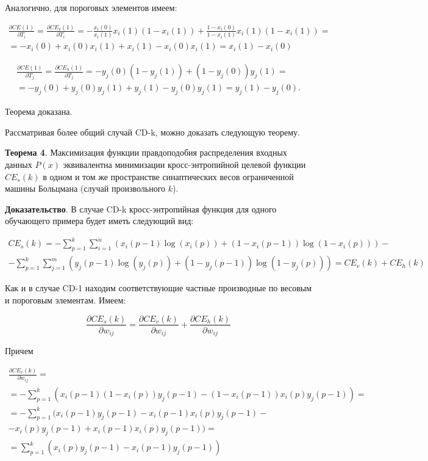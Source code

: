 Аналогично, для пороговых элементов имеем:

\begin{multline*}
	\frac{\partial CE(1)}{\partial T_i} = \frac{\partial CE_v(1)}{\partial T_i} = -\frac{x_i(0)}{x_i(1)}x_i(1)(1-x_i(1))+\frac{1-x_i(0)}{1-x_i(1)}x_i(1)(1-x_i(1)) = \\ = -x_i(0) + x_i(0)x_i(1)+x_i(1)-x_i(0)x_i(1) = x_i(1)-x_i(0) 
\end{multline*}

\begin{multline*}
	\frac{\partial CE(1)}{\partial T_j} = \frac{\partial CE_h(1)}{\partial T_j} = -y_j(0)(1-y_j(1)) + (1-y_j(0))y_j(1) = \\ = -y_j(0) + y_j(0)y_j(1) + y_j(1) - y_j(0)y_j(1) = y_j(1) - y_j(0).
\end{multline*}

Теорема доказана. 

Рассматривая более общий случай CD-k, можно доказать следующую теорему.

\textbf{Теорема 4}. Максимизация функции правдоподобия распределения входных данных $P(x)$ эквивалентна минимизации кросс-энтропийной целевой функции $CE_s(k)$ в одном и том же пространстве синаптических весов ограниченной машины Больцмана (случай произвольного $k$).

\textbf{Доказательство}. В случае CD-k кросс-энтропийная функция для одного обучающего примера будет иметь следующий вид:

\begin{multline}
	CE_s(k) = -\sum_{p=1}^k \sum_{i=1}^n (x_i(p-1)\log(x_i(p)) + (1-x_i(p-1))\log(1-x_i(p)))-\\-\sum_{p=1}^k \sum_{j=1}^m (y_j(p-1)\log (y_j(p))+(1-y_j(p-1))\log(1-y_j(p))) = CE_v(k) + CE_h(k)
\end{multline}

Как и в случае CD-1 находим соответствующие частные производные по весовым и пороговым элементам. Имеем:

\begin{equation*}
	\frac{\partial CE_s(k)}{\partial w_{ij}}= \frac{\partial CE_v(k)}{\partial w_{ij}} + \frac{\partial CE_h(k)}{\partial w_{ij}}
\end{equation*}

Причем

\begin{multline*}
	\frac{\partial CE_v(k)}{\partial w_{ij}} = \\ = -\sum_{p=1}^k (x_i(p-1)(1-x_i(p))y_j(p-1)-(1-x_i(p-1))x_i(p)y_j(p-1))=\\=-\sum_{p=1}^k (x_i(p-1)y_j(p-1)-x_i(p-1)x_i(p)y_j(p-1)-\\-x_i(p)y_j(p-1)+x_i(p-1)x_i(p)y_j(p-1)) = \\ = \sum_{p=1}^{k} (x_i(p)y_j(p-1)-x_i(p-1)y_j(p-1))
\end{multline*}

